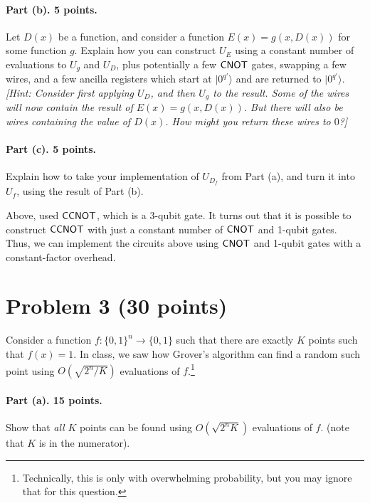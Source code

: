 \documentclass{article}
\begin{document}
\paragraph{Part (b). 5 points.} Let $D(x)$ be a function, and consider a function $E(x)=g(x,D(x))$ for some function $g$. Explain how you can construct $U_E$ using a constant number of evaluations to $U_g$ and $U_D$, plus potentially a few ${\sf CNOT}$ gates, swapping a few wires, and a few ancilla registers which start at $|0^{q'}\rangle$ and are returned to $|0^{q'}\rangle$.
\emph{[Hint: Consider first applying $U_D$, and then $U_g$ to the result. Some of the wires will now contain the result of $E(x)=g(x,D(x))$. But there will also be wires containing the value of $D(x)$. How might you return these wires to $0$?]}


\paragraph{Part (c). 5 points.} Explain how to take your implementation of $U_{D_f}$ from Part (a), and turn it into $U_f$, using the result of Part (b).

\begin{remark}Above, used ${\sf CCNOT}$, which is a 3-qubit gate. It turns out that it is possible to construct ${\sf CCNOT}$ with just a constant number of ${\sf CNOT}$ and 1-qubit gates. Thus, we can implement the circuits above using ${\sf CNOT}$ and 1-qubit gates with a constant-factor overhead.
\end{remark}


\section{Problem 3 (30 points)}

Consider a function $f:\{0,1\}^n\rightarrow\{0,1\}$ such that there are exactly $K$ points such that $f(x)=1$. In class, we saw how Grover's algorithm can find a random such point using $O(\sqrt{2^n/K})$ evaluations of $f$.\footnote{Technically, this is only with overwhelming probability, but you may ignore that for this question.}

\paragraph{Part (a). 15 points.} Show that \emph{all} $K$ points can be found using $O(\sqrt{2^n K})$ evaluations of $f$. (note that $K$ is in the numerator). 
\end{document}
